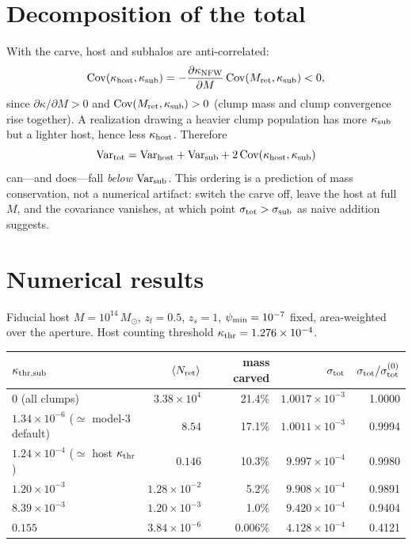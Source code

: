 \documentclass[11pt]{article}
\newcommand{\kthrs}{\kappa_{\rm thr,sub}}
\newcommand{\Mret}{M_{\rm ret}}
\begin{document}
\section{Decomposition of the total}

With the carve, host and subhalos are anti-correlated:
\begin{equation}
  {\rm Cov}(\kappa_{\rm host},\kappa_{\rm sub})
  = -\frac{\partial\kappa_{\rm NFW}}{\partial M}\,{\rm Cov}(\Mret,\kappa_{\rm sub}) < 0 ,
\end{equation}
since $\partial\kappa/\partial M>0$ and ${\rm Cov}(\Mret,\kappa_{\rm sub})>0$ (clump mass and
clump convergence rise together). A realization drawing a heavier clump population has more
$\kappa_{\rm sub}$ but a lighter host, hence less $\kappa_{\rm host}$. Therefore
\begin{equation}
  {\rm Var}_{\rm tot}={\rm Var}_{\rm host}+{\rm Var}_{\rm sub}
  +2\,{\rm Cov}(\kappa_{\rm host},\kappa_{\rm sub})
\end{equation}
can---and does---fall \emph{below} ${\rm Var}_{\rm sub}$. This ordering is a prediction of
mass conservation, not a numerical artifact: switch the carve off, leave the host at full
$M$, and the covariance vanishes, at which point $\sigma_{\rm tot}>\sigma_{\rm sub}$ as naive
addition suggests.

\section{Numerical results}

Fiducial host $M=10^{14}\,M_\odot$, $z_l=0.5$, $z_s=1$, $\psi_{\rm min}=10^{-7}$ fixed,
area-weighted over the aperture. Host counting threshold $\kappa_{\rm thr}=1.276\times10^{-4}$.

\begin{table}[h]\centering
\begin{tabular}{lrrrr}
\toprule
$\kthrs$ & $\langle N_{\rm ret}\rangle$ & mass carved & $\sigma_{\rm tot}$ &
$\sigma_{\rm tot}/\sigma_{\rm tot}^{(0)}$\\
\midrule
$0$ (all clumps)          & $3.38\times10^{4}$   & 21.4\%  & $1.0017\times10^{-3}$ & 1.0000\\
$1.34\times10^{-6}$ ($\simeq$ model-3 default) & $8.54$ & 17.1\% & $1.0011\times10^{-3}$ & 0.9994\\
$1.24\times10^{-4}$ ($\simeq$ host $\kappa_{\rm thr}$) & $0.146$ & 10.3\% & $9.997\times10^{-4}$ & 0.9980\\
$1.20\times10^{-3}$       & $1.28\times10^{-2}$  & 5.2\%   & $9.908\times10^{-4}$  & 0.9891\\
$8.39\times10^{-3}$       & $1.20\times10^{-3}$  & 1.0\%   & $9.420\times10^{-4}$  & 0.9404\\
$0.155$                   & $3.84\times10^{-6}$  & 0.006\% & $4.128\times10^{-4}$  & 0.4121\\
\bottomrule
\end{tabular}
\end{table}
\end{document}
